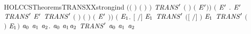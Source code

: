 \begin{SaveVerbatim}{HOLCCSTheoremsTRANSXXstrongind}
        \ensuremath{(}\ensuremath{(} \HOLSymConst{\ensuremath{=}} \HOLConst{\ensuremath{\tau}}\ensuremath{)} \HOLSymConst{\HOLTokenDisj{}} \ensuremath{(} \HOLSymConst{\ensuremath{=}}  \ensuremath{)} \HOLSymConst{\HOLTokenConj{}}  \HOLConst{\HOLTokenNotIn{}}  \HOLSymConst{\HOLTokenConj{}}   \HOLConst{\HOLTokenNotIn{}} \ensuremath{)} \HOLSymConst{\HOLTokenImp{}}
        \ensuremath{\HOLBoundVar{TRANS}\sp{\prime{}}} \ensuremath{(}  \ensuremath{)}  \ensuremath{(}  \ensuremath{\HOLBoundVar{E}\sp{\prime{}}}\ensuremath{)}\ensuremath{)} \HOLSymConst{\HOLTokenConj{}}
     \ensuremath{(}\HOLSymConst{\HOLTokenForall{}}  \ensuremath{\HOLBoundVar{E}\sp{\prime{}}} .
         \HOLTokenTransBegin{}\HOLTokenTransEnd \ensuremath{\HOLBoundVar{E}\sp{\prime{}}} \HOLSymConst{\HOLTokenConj{}} \ensuremath{\HOLBoundVar{TRANS}\sp{\prime{}}}   \ensuremath{\HOLBoundVar{E}\sp{\prime{}}} \HOLSymConst{\HOLTokenImp{}}
        \ensuremath{\HOLBoundVar{TRANS}\sp{\prime{}}} \ensuremath{(}  \ensuremath{)} \ensuremath{(}  \ensuremath{)} \ensuremath{(} \ensuremath{\HOLBoundVar{E}\sp{\prime{}}} \ensuremath{)}\ensuremath{)} \HOLSymConst{\HOLTokenConj{}}
     \ensuremath{(}\HOLSymConst{\HOLTokenForall{}}   \ensuremath{\HOLBoundVar{E}\sb{\mathrm{1}}}.
        \ensuremath{[}  \ensuremath{/}\ensuremath{]}  \HOLTokenTransBegin{}\HOLTokenTransEnd \ensuremath{\HOLBoundVar{E}\sb{\mathrm{1}}} \HOLSymConst{\HOLTokenConj{}} \ensuremath{\HOLBoundVar{TRANS}\sp{\prime{}}} \ensuremath{(}\ensuremath{[}  \ensuremath{/}\ensuremath{]} \ensuremath{)}  \ensuremath{\HOLBoundVar{E}\sb{\mathrm{1}}} \HOLSymConst{\HOLTokenImp{}}
        \ensuremath{\HOLBoundVar{TRANS}\sp{\prime{}}} \ensuremath{(}  \ensuremath{)}  \ensuremath{\HOLBoundVar{E}\sb{\mathrm{1}}}\ensuremath{)} \HOLSymConst{\HOLTokenImp{}}
     \HOLSymConst{\HOLTokenForall{}}\ensuremath{\HOLBoundVar{a}\sb{\mathrm{0}}} \ensuremath{\HOLBoundVar{a}\sb{\mathrm{1}}} \ensuremath{\HOLBoundVar{a}\sb{\mathrm{2}}}. \ensuremath{\HOLBoundVar{a}\sb{\mathrm{0}}} \HOLTokenTransBegin\ensuremath{\HOLBoundVar{a}\sb{\mathrm{1}}}\HOLTokenTransEnd \ensuremath{\HOLBoundVar{a}\sb{\mathrm{2}}} \HOLSymConst{\HOLTokenImp{}} \ensuremath{\HOLBoundVar{TRANS}\sp{\prime{}}} \ensuremath{\HOLBoundVar{a}\sb{\mathrm{0}}} \ensuremath{\HOLBoundVar{a}\sb{\mathrm{1}}} \ensuremath{\HOLBoundVar{a}\sb{\mathrm{2}}}
\end{SaveVerbatim}

